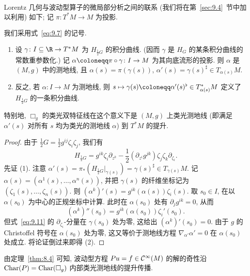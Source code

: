 Lorentz 几何与波动型算子的微局部分析之间的联系 (我们将在第~\ref{sec:9.4}~节中加以利用) 如下; 记 $\pi \colon T^* M \to M$ 为投影.

\begin{proposition}[双特征线与测地线]\label{prop:9.9}
我们采用式~\eqref{eq:9.7} 的记号.
\begin{enumerate}
    \item 设 $\gamma \colon I \subseteq \R \to T^* M$ 为 $H_{\frac12 G}$ 的积分曲线. (因而 $\gamma$ 是 $H_G$ 的某条积分曲线的常数重参数化.) 记 $\alpha \defeq \pi \circ \gamma \colon I \to M$ 为其向底流形的投影. 则 $\alpha$ 是 $(M, g)$ 中的测地线, 且 $\alpha(s) = \pi(\gamma(s))$, $\alpha'(s) = \gamma(s)^\sharp \in T_{\alpha(s)} M$.
    \item 反之, 若 $\alpha \colon I \to M$ 为测地线, 则 $s \mapsto \gamma(s) \defeq \alpha'(s)^\flat \in T^*_{\alpha(s)} M$ 定义了 $H_{\frac12 G}$ 的一条积分曲线.
\end{enumerate}
特别地, $\Box_g$ 的类光双特征线在这个意义下是 $(M, g)$ 上类光测地线 (即满足 $\alpha'(s)$ 对所有 $s$ 均为类光的测地线 $\alpha$) 到 $T^* M$ 的提升.
\end{proposition}

\begin{proof}
由于 $\frac12 G = \frac12 g^{ij} \zeta_i \zeta_j$, 我们有
\begin{equation}\label{eq:9.11}
    H_{\frac12 G} = g^{ik} \zeta_i \partial_{z^k} - \frac12 (\partial_{z^i} g^{jk}) \zeta_j \zeta_k \partial_{\zeta_i}.
\end{equation}
先证 (1). 注意 $\alpha'(s) = \pi_*(H_{\frac12 G}|_{\gamma(s)}) = \gamma(s)^\sharp \in T_{\gamma(s)} M$. 记 $\alpha(s) = (\alpha^1(s), \ldots, \alpha^n(s))$, 并把 $\gamma(s)$ 的纤维坐标记为 $(\zeta_1(s), \ldots, \zeta_n(s))$. 则 $(\alpha^k)'(s) = g^{ik}(\alpha(s)) \zeta_i(s)$. 取 $s_0 \in I$, 在以 $\alpha(s_0)$ 为中心的正规坐标中计算. 此时在 $\alpha(s_0)$ 处有 $\partial_j g^{ik} = 0$, 从而
\begin{equation}\label{eq:9.12}
    (\alpha^k)''(s_0) = g^{ik}(\alpha(s_0)) \zeta_i'(s_0).
\end{equation}
但式~\eqref{eq:9.11} 的 $\partial_{\zeta_i}$-分量在 $\gamma(s_0)$ 处为零, 这给出 $(\alpha^k)'(s_0) = 0$. 由于 $g$ 的 Christoffel 符号在 $\alpha(s_0)$ 处为零, 这又等价于测地线方程 $\nabla_{\alpha'} \alpha' = 0$ 在 $\alpha(s_0)$ 处成立. 将论证倒过来即得 (2).
\end{proof}

由定理~\ref{thm:8.4} 可知, 波动型方程 $P u = f \in \mathcal{C}^\infty(M)$ 的解的奇性沿 $\operatorname{Char}(P) = \operatorname{Char}(\Box_g)$ 内部类光测地线的提升传播.

